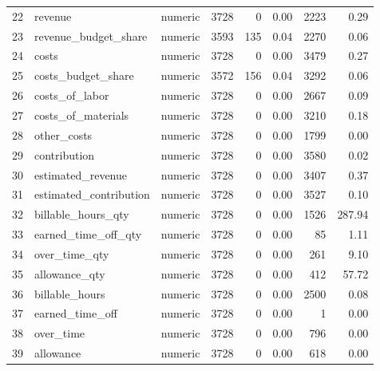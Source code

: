 \begin{sidewaystable}[ht]
\begin{tabular}{rllrrrrr}
  22 & revenue & numeric & 3728 &   0 & 0.00 & 2223 & 0.29 \\ 
  23 & revenue\_budget\_share & numeric & 3593 & 135 & 0.04 & 2270 & 0.06 \\ 
  24 & costs & numeric & 3728 &   0 & 0.00 & 3479 & 0.27 \\ 
  25 & costs\_budget\_share & numeric & 3572 & 156 & 0.04 & 3292 & 0.06 \\ 
  26 & costs\_of\_labor & numeric & 3728 &   0 & 0.00 & 2667 & 0.09 \\ 
  27 & costs\_of\_materials & numeric & 3728 &   0 & 0.00 & 3210 & 0.18 \\ 
  28 & other\_costs & numeric & 3728 &   0 & 0.00 & 1799 & 0.00 \\ 
  29 & contribution & numeric & 3728 &   0 & 0.00 & 3580 & 0.02 \\ 
  30 & estimated\_revenue & numeric & 3728 &   0 & 0.00 & 3407 & 0.37 \\ 
  31 & estimated\_contribution & numeric & 3728 &   0 & 0.00 & 3527 & 0.10 \\ 
  32 & billable\_hours\_qty & numeric & 3728 &   0 & 0.00 & 1526 & 287.94 \\ 
  33 & earned\_time\_off\_qty & numeric & 3728 &   0 & 0.00 &  85 & 1.11 \\ 
  34 & over\_time\_qty & numeric & 3728 &   0 & 0.00 & 261 & 9.10 \\ 
  35 & allowance\_qty & numeric & 3728 &   0 & 0.00 & 412 & 57.72 \\ 
  36 & billable\_hours & numeric & 3728 &   0 & 0.00 & 2500 & 0.08 \\ 
  37 & earned\_time\_off & numeric & 3728 &   0 & 0.00 &   1 & 0.00 \\ 
  38 & over\_time & numeric & 3728 &   0 & 0.00 & 796 & 0.00 \\ 
  39 & allowance & numeric & 3728 &   0 & 0.00 & 618 & 0.00 \\ 
   \hline
\end{tabular}
\end{sidewaystable}
